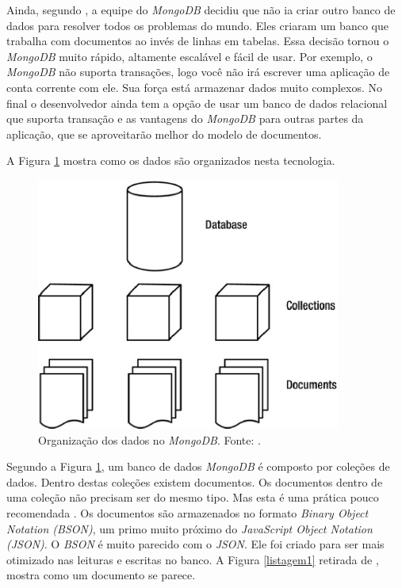 Ainda, segundo , a equipe do \emph{MongoDB} decidiu que não ia criar outro banco de dados para resolver todos os problemas do mundo. Eles criaram um banco que trabalha com documentos ao invés de linhas em tabelas. Essa decisão tornou o \emph{MongoDB} muito rápido, altamente escalável e fácil de usar. Por exemplo, o \emph{MongoDB} não suporta transações, logo você não irá escrever uma aplicação de conta corrente com ele. Sua força está armazenar dados muito complexos. No final o desenvolvedor ainda tem a opção de usar um banco de dados relacional que suporta transação e as vantagens do \emph{MongoDB} para outras partes da aplicação, que se aproveitarão melhor do modelo de documentos.


A Figura \ref{mongodb} mostra como os dados são organizados nesta tecnologia.

\begin{figure}[ht]
	\centering
	\includegraphics[width=10cm]{figuras/mongodb.eps}
	\caption{Organização dos dados no \emph{MongoDB}. Fonte: .}
	\label{mongodb}
\end{figure}

Segundo a Figura \ref{mongodb}, um banco de dados \emph{MongoDB} é composto por coleções de dados. 
Dentro destas coleções existem documentos. 
Os documentos dentro de uma coleção não precisam ser do mesmo tipo. 
Mas esta é uma prática pouco recomendada \cite{Plugge2014}. 
Os documentos são armazenados no formato \emph{Binary Object Notation (BSON)}, um primo muito próximo do \emph{JavaScript Object Notation (JSON)}. 
O \emph{BSON} é muito parecido com o \emph{JSON}. Ele foi criado para ser mais otimizado nas leituras e escritas no banco. A Figura \ref{listagem1} retirada de , mostra como um documento se parece.

